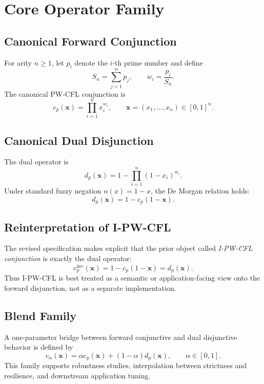 \documentclass[11pt]{article}
\begin{document}
\section{Core Operator Family}
\subsection{Canonical Forward Conjunction}
For arity $n \ge 1$, let $p_i$ denote the $i$-th prime number and define
\[
S_n = \sum_{j=1}^{n} p_j, \qquad w_i = \frac{p_i}{S_n}.
\]
The canonical PW-CFL conjunction is
\[
 c_p(\mathbf{x}) = \prod_{i=1}^{n} x_i^{w_i}, \qquad \mathbf{x} = (x_1,\dots,x_n) \in [0,1]^n.
\]

\subsection{Canonical Dual Disjunction}
The dual operator is
\[
 d_p(\mathbf{x}) = 1 - \prod_{i=1}^{n} (1-x_i)^{w_i}.
\]
Under standard fuzzy negation $n(x)=1-x$, the De Morgan relation holds:
\[
 d_p(\mathbf{x}) = 1 - c_p(1-\mathbf{x}).
\]

\subsection{Reinterpretation of I-PW-CFL}
The revised specification makes explicit that the prior object called \emph{I-PW-CFL conjunction} is exactly the dual operator:
\[
 c_p^{\mathrm{inv}}(\mathbf{x}) = 1 - c_p(1-\mathbf{x}) = d_p(\mathbf{x}).
\]
Thus I-PW-CFL is best treated as a semantic or application-facing view onto the forward disjunction, not as a separate implementation.

\subsection{Blend Family}
A one-parameter bridge between forward conjunctive and dual disjunctive behavior is defined by
\[
 c_{\alpha}(\mathbf{x}) = \alpha c_p(\mathbf{x}) + (1-\alpha)d_p(\mathbf{x}), \qquad \alpha \in [0,1].
\]
This family supports robustness studies, interpolation between strictness and resilience, and downstream application tuning.
\end{document}
